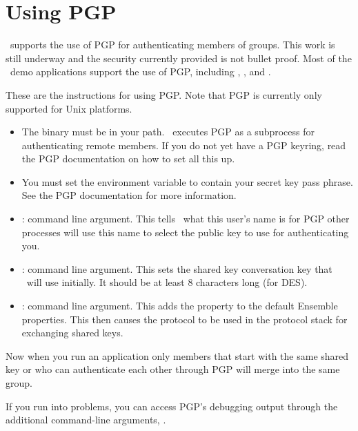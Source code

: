 %
%
%
\section{Using PGP}

\ensemble\ supports the use of PGP for authenticating members of
groups.  This work is still underway and the security currently
provided is not bullet proof.  Most of the \ensemble\ demo
applications support the use of PGP, including ,
, and .

These are the instructions for using PGP.  Note that PGP is currently
only supported for Unix platforms.

\begin{itemize}
\item
The  binary must be in your path.  \ensemble\ executes PGP
as a subprocess for authenticating remote members.  If you do not yet
have a PGP keyring, read the PGP documentation on how to set all this
up.
\item
You must set the  environment variable to contain your
secret key pass phrase.  See the PGP documentation for more
information.
\item
{} : command line argument.  This tells \ensemble\ what
this user's name is for PGP other processes will use this name to
select the public key to use for authenticating you.
\item
{}: command line argument.  This sets the shared
key conversation key that \ensemble\ will use initially.  It should
be at least $8$ characters long (for DES).
\item
{}: command line argument.  This adds the
 property to the default Ensemble properties.  This then
causes the  protocol to be used in the protocol stack
for exchanging shared keys.
\end{itemize}

Now when you run an application only members that start with the same
shared key or who can authenticate each other through PGP will
merge into the same group.

If you run into problems, you can access PGP's debugging output
through the additional command-line arguments, .

